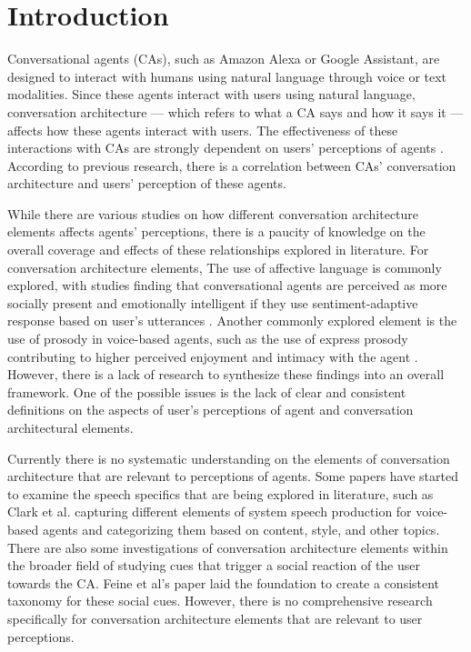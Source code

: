 
\section{Introduction}

Conversational agents (CAs), such as Amazon Alexa or Google Assistant, are designed to interact with humans using natural language through voice or text modalities. Since these agents interact with users using natural language, conversation architecture — which refers to what a CA says and how it says it — affects how these agents interact with users. The effectiveness of these interactions with CAs are strongly dependent on users' perceptions of agents \cite{knijnenburg2016inferring}\cite{seeger2021chatbots}. According to previous research, there is a correlation between CAs' conversation architecture and users' perception of these agents.

While there are various studies on how different conversation architecture elements affects agents' perceptions, there is a paucity of knowledge on the overall coverage and effects of these relationships explored in literature. For conversation architecture elements, The use of affective language is commonly explored, with studies finding that conversational agents are perceived as more socially present and emotionally intelligent if they use sentiment-adaptive response based on user's utterances \cite{diederich2019emulating}\cite{yang2017perceived}. Another commonly explored element is the use of prosody in voice-based agents, such as the use of express prosody contributing to higher perceived enjoyment and intimacy with the agent \cite{kim2020can}. However, there is a lack of research to synthesize these findings into an overall framework. One of the possible issues is the lack of clear and consistent definitions on the aspects of user's perceptions of agent and conversation architectural elements.

Currently there is no systematic understanding on the elements of conversation architecture that are relevant to perceptions of agents. Some papers have started to examine the speech specifics that are being explored in literature, such as Clark et al. \cite{clark2019state} capturing different elements of system speech production for voice-based agents and categorizing them based on content, style, and other topics. There are also some investigations of conversation architecture elements within the broader field of studying cues that trigger a social reaction of the user towards the CA. Feine et al's \cite{feine2019taxonomy} paper laid the foundation to create a consistent taxonomy for these social cues. However, there is no comprehensive research specifically for conversation architecture elements that are relevant to user perceptions. 

